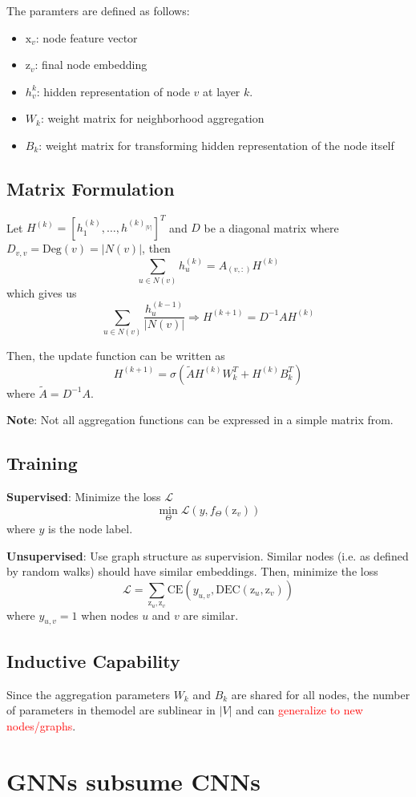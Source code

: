 \documentclass[12pt]{article}
\newcommand{\tbf}{\textbf}
\newcommand{\tcR}{\textcolor{red}}
\newcommand{\mcal}{\mathcal}
\newcommand{\mrm}{\mathrm}
\begin{document}
\smallskip
The paramters are defined as follows:
\begin{itemize}
  \item $\mrm{x}_v$: node feature vector
  \item $\mrm{z}_v$: final node embedding
  \item $h^k_v$: hidden representation of node $v$ at layer $k$.
  \item $W_k$: weight matrix for neighborhood aggregation
  \item $B_k$: weight matrix for transforming hidden representation of the node
    itself
\end{itemize}

\subsection*{Matrix Formulation}

Let $H^{(k)} = [h^{(k)}_1, \hdots, h^{(k)_{|V|}}]^T$ and $D$ be a diagonal
matrix where $D_{v,v} = \text{Deg}(v) = |N(v)|$, then
\[
  \sum_{u \in N(v)} h^{(k)}_u = A_{(v,:)}H^{(k)}
\] which gives us
\[
  \sum_{u \in N(v)} \frac{h^{(k-1)}_u}{|N(v)|} \Rightarrow H^{(k+1)} =
  D^{-1}AH^{(k)}
\]

Then, the update function can be written as 
\[
  H^{(k+1)} = \sigma\left(\tilde{A}H^{(k)}W^T_k + H^{(k)}B^T_k\right)
\]
where $\tilde{A} = D^{-1}A$.

\medskip
\tbf{Note}: Not all aggregation functions can be expressed in a simple matrix
from.

\subsection*{Training}

\tbf{Supervised}: Minimize the loss $\mcal{L}$
\[
  \min_{\Theta} \mcal{L}(y, f_{\Theta}(\mrm{z}_v))
\]
where $y$ is the node label.

\medskip
\tbf{Unsupervised}: Use graph structure as supervision. Similar nodes (i.e. as
defined by random walks) should have similar embeddings. Then, minimize the loss
\[
  \mcal{L} = \sum_{\mrm{z}_u, \mrm{z}_v}
  \mrm{CE}\left(y_{u,v},\mrm{DEC}(\mrm{z}_u,\mrm{z}_v)\right)
\]
where $y_{u,v}=1$ when nodes $u$ and $v$ are similar.

\subsection*{Inductive Capability}

Since the aggregation parameters $W_k$ and $B_k$ are shared for all nodes, the
number of parameters in themodel are sublinear in $|V|$ and can \tcR{generalize
to new nodes/graphs}.

\section*{GNNs subsume CNNs}

\end{document}
